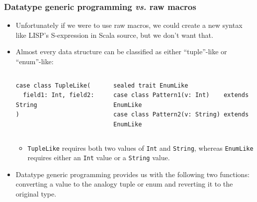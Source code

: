 \begin{frame}[fragile]
  \frametitle{Datatype generic programming \textit{vs.} raw macros}

  \pause
  \begin{itemize}
    \item<+-> Unfortunately if we were to use raw macros, we could create a new syntax like LISP's S-expression in Scala source,
    but we don't want that.

    \item<+-> Almost every data structure can be classified as either ``tuple''-like or ``enum''-like:
    \begin{columns}
      \begin{column}{0.32\textwidth}
\begin{lstlisting}[style=scala]
case class TupleLike(
  field1: Int, field2: String
)
\end{lstlisting}
      \end{column}
      \begin{column}{0.5\textwidth}
\begin{lstlisting}[style=scala]
sealed trait EnumLike
case class Pattern1(v: Int)    extends EnumLike
case class Pattern2(v: String) extends EnumLike
\end{lstlisting}
      \end{column}
    \end{columns}
    \begin{itemize}
      \item \lstinline|TupleLike| requires both two values of \lstinline|Int| and \lstinline|String|,
      whereas \lstinline|EnumLike| requires either an \lstinline|Int| value or a \lstinline|String| value.
    \end{itemize}

    \item<+-> Datatype generic programming provides us with the following two functions: 
       converting a value to the analogy tuple or enum
       and reverting it to the original type.
  \end{itemize}

\end{frame}
